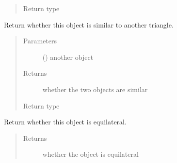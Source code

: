 \documentclass[letterpaper,10pt,english]{sphinxmanual}
\begin{document}
\begin{fulllineitems}
\begin{fulllineitems}
\begin{quote}
\begin{description}
\item[{Return type}] \leavevmode
{}

\end{description}\end{quote}

\end{fulllineitems}


\begin{fulllineitems}
\label{\detokenize{api:trianglelib.shape.Triangle.is_similar}}
Return whether this {\hyperref[\detokenize{api:trianglelib.shape.Triangle}]{}} object is similar to another triangle.
\begin{quote}\begin{description}
\item[{Parameters}] \leavevmode
{} ({\hyperref[\detokenize{api:trianglelib.shape.Triangle}]{}}) \textendash{} another {\hyperref[\detokenize{api:trianglelib.shape.Triangle}]{}} object

\item[{Returns}] \leavevmode
whether the two {\hyperref[\detokenize{api:trianglelib.shape.Triangle}]{}} objects are similar

\item[{Return type}] \leavevmode
{}

\end{description}\end{quote}

\end{fulllineitems}


\begin{fulllineitems}
\label{\detokenize{api:trianglelib.shape.Triangle.is_equilateral}}
Return whether this {\hyperref[\detokenize{api:trianglelib.shape.Triangle}]{}} object is equilateral.
\begin{quote}\begin{description}
\item[{Returns}] \leavevmode
whether the {\hyperref[\detokenize{api:trianglelib.shape.Triangle}]{}} object is equilateral


\end{description}
\end{quote}
\end{fulllineitems}
\end{fulllineitems}
\end{document}

